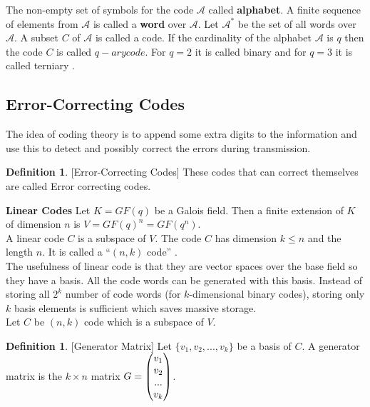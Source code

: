 \documentclass[11pt]{amsart}
\theoremstyle{plain}
\theoremstyle{definition}
\newtheorem{definition}[theorem]{Definition}
\numberwithin{equation}{section}
\begin{document}
The non-empty set of symbols for the code \(\mathcal{A}\) called \textbf{alphabet}. A finite sequence of elements from \(\mathcal{A}\) is called a \textbf{word} over \(\mathcal{A}\). Let \(\mathcal{A}^*\) be the set of all words over \(\mathcal{A}\). A subset \(C\) of \(\mathcal{A}\) is called a code.
If the cardinality of the alphabet \(\mathcal{A}\) is \(q\) then the code \(C\) is called \(q-ary code\). For \(q=2\) it is called binary and for \(q=3\) it is called terniary \cite{error_correct}.

\subsection{Error-Correcting Codes}
The idea of coding theory is to append some extra digits to the information and use this to detect and possibly correct the errors during transmission.
\begin{definition} \cite{coding} [Error-Correcting Codes]
  These codes that can correct themselves are called Error correcting codes.
\end{definition}

\textbf{Linear Codes}
Let \(K=GF(q)\) be a Galois field. Then a finite extension of \(K\) of dimension \(n\) is \(V=GF(q)^n=GF(q^n)\).\\[3mm]
A linear code \(C\) is a subspace of \(V\). The code \(C\) has dimension \(k \leq n\) and the length \(n\). It is called a ``\((n,k)\) code'' \cite{error_correct}.\\[5mm]


The usefulness of linear code is that they are vector spaces over the base field so they have a basis. All the code words can be generated with this basis. Instead of storing all \(2^k\) number of code words (for \(k\)-dimensional binary codes), storing only \(k\) basis elements is sufficient which saves massive storage.\\[2mm]
Let \(C\) be \((n,k)\) code which is a subspace of \(V\).
\vspace{5mm}

\begin{definition} \cite{error_correct} [Generator Matrix]
  Let \(\{v_1, v_2,...,v_k\}\) be a basis of \(C\). A generator matrix is the \(k \times n\) matrix \(G=\begin{pmatrix} \small
      v_1\\
      v_2\\
      ...\\
      v_k
    \end{pmatrix}
  \).
\end{definition}
\end{document}
